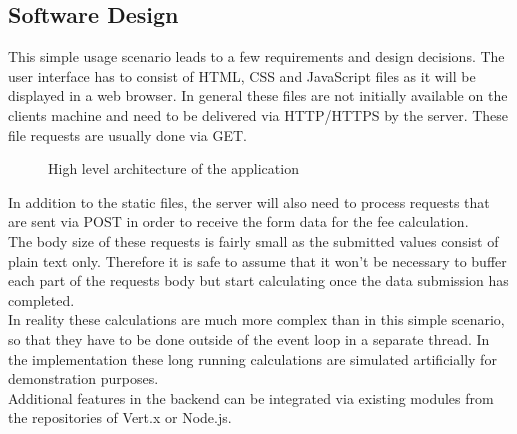 




\FloatBarrier
\subsection{Software Design}
\label{software_design}


This simple usage scenario leads to a few requirements and
design decisions.
The user interface has to consist of HTML, CSS and JavaScript files as it 
will be displayed in a web browser. In general these files are not initially
available on the clients machine and need to be delivered via HTTP/HTTPS by the
server. These file requests are usually done via GET.\\

\begin{figure}[h]
	\centering
	\setlength\fboxsep{2pt}
	\caption{High level architecture of the application}
	\label{fig:high_level_architecture}
\end{figure}

In addition to the static files, the server will also need to process
requests that are sent via POST in order to receive the form data for the
fee calculation.\\
The body size of these requests is fairly small as the submitted values consist
of plain text only. Therefore it is safe to assume that it won't be necessary to
buffer each part of the requests body but start calculating once the data
submission has completed.\\
In reality these calculations are much more complex than in this simple scenario,
so that they have to be done outside of the event loop in a separate thread.
In the implementation these long running calculations are simulated artificially for
demonstration purposes.\\
Additional features in the backend can be integrated via existing modules from
the repositories of Vert.x or Node.js.

